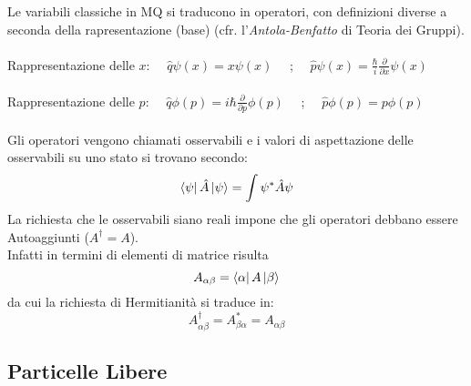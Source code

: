 \documentclass[twoside]{article}
\begin{document}
Le variabili classiche in MQ si traducono in operatori, con definizioni diverse a seconda della rapresentazione (base) (cfr. l'\textit{Antola-Benfatto} di Teoria dei Gruppi).
\\ \\
Rappresentazione delle $x$: \ \  $\hat{q}\psi(x)=x\psi(x)$ \ \ ; \ \ $\hat{p}\psi(x)=\frac{\hbar}{i}\frac{\partial}{\partial x} \psi(x)$
\\ \\
Rappresentazione delle $p$: \ \  $\hat{q}\phi(p)=i\hbar \frac{\partial}{\partial p} \phi(p)$ \ \ ; \ \  $\hat{p}\phi(p)=p\phi(p)$ 
\\ \\ 
Gli operatori vengono chiamati osservabili e i valori di aspettazione delle osservabili su uno stato si trovano secondo:
\begin{equation}
    \bra{\psi}\hat{A}\ket{\psi} = \int{\psi^* \hat{A}\psi}
\end{equation}
La richiesta che le osservabili siano reali impone che gli operatori debbano essere Autoaggiunti ($A^\dagger =A$).
\\
Infatti in termini di elementi di matrice risulta
\begin{equation}
    A_{\alpha \beta}=\bra{\alpha}A\ket{\beta}
\end{equation}
da cui la richiesta di Hermitianità si traduce in:
\begin{equation}
    A_{\alpha \beta} ^{\dagger}=A_{\beta \alpha} ^* = A_{\alpha \beta}
\end{equation}

\vspace{0.5cm}

\subsection{Particelle Libere}
\end{document}
